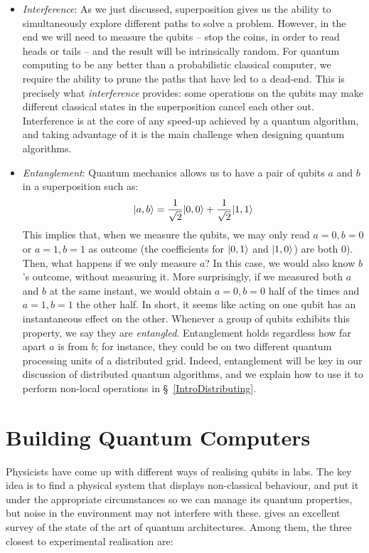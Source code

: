 \begin{itemize}
  \item \textit{Interference}: As we just discussed, superposition gives us the ability to simultaneously explore different paths to solve a problem. However, in the end we will need to measure the qubits -- stop the coins, in order to read heads or tails -- and the result will be intrinsically random. For quantum computing to be any better than a probabilistic classical computer, we require the ability to prune the paths that have led to a dead-end. This is precisely what \textit{interference} provides: some operations on the qubits may make different classical states in the superposition cancel each other out. Interference is at the core of any speed-up achieved by a quantum algorithm, and taking advantage of it is the main challenge when designing quantum algorithms.

  \item \textit{Entanglement}: Quantum mechanics allows us to have a pair of qubits \(a\) and \(b\) in a superposition such as: \[\vert a,b \rangle = \frac{1}{\sqrt{2}}\vert 0,0 \rangle + \frac{1}{\sqrt{2}}\vert 1,1 \rangle\] This implies that, when we measure the qubits, we may only read \(a=0, b=0\) or \(a=1, b=1\) as outcome (the coefficients for \(\vert 0,1 \rangle\) and \(\vert 1,0 \rangle\)) are both \(0\)). Then, what happens if we only measure \(a\)? In this case, we would also know \(b\)'s outcome, without measuring it. More surprisingly, if we measured both \(a\) and \(b\) at the same instant, we would obtain \(a=0, b=0\) half of the times and \(a=1, b=1\) the other half. In short, it seems like acting on one qubit has an instantaneous effect on the other. Whenever a group of qubits exhibits this property, we say they are \textit{entangled}. Entanglement holds regardless how far apart \(a\) is from \(b\); for instance, they could be on two different quantum processing units of a distributed grid. Indeed, entanglement will be key in our discussion of distributed quantum algorithms, and we explain how to use it to perform non-local operations in \S~\ref{IntroDistributing}.

\end{itemize}


\section{Building Quantum Computers}
\label{Hardware}

Physicists have come up with different ways of realising qubits in labs. The key idea is to find a physical system that displays non-classical behaviour, and put it under the appropriate circumstances so we can manage its quantum properties, but noise in the environment may not interfere with these. \citet{ArchitectureSurvet} gives an excellent survey of the state of the art of quantum architectures. Among them, the three closest to experimental realisation are:

